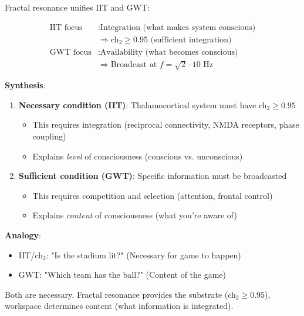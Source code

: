 \begin{theorem}\label{thm:unified}
Fractal resonance unifies IIT and GWT:

\begin{align}
\text{IIT focus} &: \text{Integration (what makes system conscious)} \\
&\Rightarrow \text{ch}_2 \geq 0.95 \text{ (sufficient integration)} \\
\text{GWT focus} &: \text{Availability (what becomes conscious)} \\
&\Rightarrow \text{Broadcast at } f = \sqrt{2} \cdot 10\text{ Hz}
\end{align}

\textbf{Synthesis}:
\begin{enumerate}
\item \textbf{Necessary condition (IIT)}: Thalamocortical system must have ch$_2 \geq 0.95$
  \begin{itemize}
  \item This requires integration (reciprocal connectivity, NMDA receptors, phase coupling)
  \item Explains \textit{level} of consciousness (conscious vs. unconscious)
  \end{itemize}

\item \textbf{Sufficient condition (GWT)}: Specific information must be broadcasted
  \begin{itemize}
  \item This requires competition and selection (attention, frontal control)
  \item Explains \textit{content} of consciousness (what you're aware of)
  \end{itemize}
\end{enumerate}

\textbf{Analogy}:
\begin{itemize}
\item IIT/ch$_2$: "Is the stadium lit?" (Necessary for game to happen)
\item GWT: "Which team has the ball?" (Content of the game)
\end{itemize}

Both are necessary. Fractal resonance provides the substrate (ch$_2 \geq 0.95$), workspace determines content (what information is integrated).
\end{theorem}

